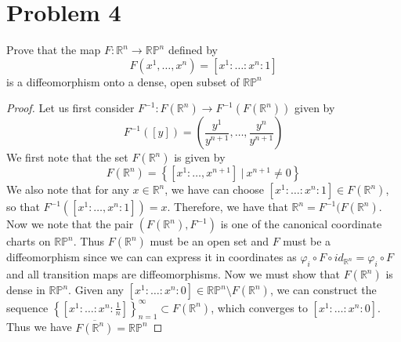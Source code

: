 \documentclass[a4paper]{article}
\begin{document}
\section*{Problem 4}%
Prove that the map $F: \mathds{R}^n \rightarrow \mathds{RP}^n$ defined by 
\[
  F(x^1, \dots, x^n) = [x^1: \dots: x^n:1]
\]
is a diffeomorphism onto a dense, open subset of  $\mathds{RP}^n$
\begin{proof}
  Let us first consider $F^{-1}: F(\mathds{R}^n) \rightarrow F^{-1}(F(\mathds{R}^n))$ given by 
  \[
    F^{-1}([y]) = \left( \frac{y^1}{y^{n+1}}, \dots, \frac{y^n}{y^{n+1}}\right)
  \]
  We first note that the set $F(\mathds{R}^n)$ is given by
  \[
    F(\mathds{R}^n) = \left\{ [x^1: \dots, x^{n+1}]\ |\ x^{n+1} \neq 0 \right\}
  \]
  We also note that for any $x \in \mathds{R}^n$, we have can choose $[x^1: \dots: x^n:1] \in F(\mathds{R}^n)$, so that $F^{-1}([x^1:\dots,x^n:1]) = x$. Therefore, we have that $\mathds{R}^n = F^{-1}(F(\mathds{R}^n)$. Now we note that the pair $(F(\mathds{R}^n), F^{-1})$ is one of the canonical coordinate charts on $\mathds{RP}^n$. Thus $F(\mathds{R}^n)$ must be an open set and $F$ must be a diffeomorphism since we can can express it in coordinates as $\varphi_i \circ F \circ id_{\mathds{R}^n} = \varphi_i \circ F$  and all transition maps are diffeomorphisms. Now we must show that $F(\mathds{R}^n)$ is dense in $\mathds{RP}^n$. Given any $[x^1: \dots: x^n: 0] \in \mathds{RP}^n \setminus F(\mathds{R}^n)$, we can construct the sequence $\left\{ [x^1: \dots: x^n: \frac{1}{n}] \right\}_{n=1}^{\infty} \subset F(\mathds{R}^n)$, which converges to $[x^1: \dots: x^n: 0]$. Thus we have $\overline{F(\mathds{R}^n)} = \mathds{RP}^n$
\end{proof}
\end{document}
